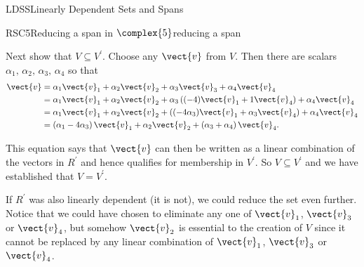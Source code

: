 \begin{subsect}{LDSS}{Linearly Dependent Sets and Spans}
\begin{example}{RSC5}{Reducing a span in $\complex{5}$}{reducing a span}
%
\begin{para}Next show that $V\subseteq V^\prime$.  Choose any $\vect{v}$ from $V$.  Then there are scalars $\alpha_1,\,\alpha_2,\,\alpha_3,\,\alpha_4$ so that
%
\begin{align*}
\vect{v}&=
%
\alpha_1\vect{v}_1+\alpha_2\vect{v}_2+\alpha_3\vect{v}_3+\alpha_4\vect{v}_4\\
%
&=\alpha_1\vect{v}_1+\alpha_2\vect{v}_2+
\alpha_3\left((-4)\vect{v}_1+1\vect{v}_4\right)+
\alpha_4\vect{v}_4\\
%
&=\alpha_1\vect{v}_1+\alpha_2\vect{v}_2+
\left((-4\alpha_3)\vect{v}_1+\alpha_3\vect{v}_4\right)+
\alpha_4\vect{v}_4\\
%
&=\left(\alpha_1-4\alpha_3\right)\vect{v}_1+
\alpha_2\vect{v}_2+
\left(\alpha_3+\alpha_4\right)\vect{v}_4.
\end{align*}
\end{para}
%
\begin{para}This equation says that $\vect{v}$ can then be written as a linear combination of the vectors in $R^\prime$ and hence qualifies for membership in $V^\prime$.  So $V\subseteq V^\prime$ and we have established that $V=V^\prime$.\end{para}
%
\begin{para}If $R^\prime$ was also linearly dependent (it is not), we could reduce the set even further.  Notice that we could have chosen to eliminate any one of $\vect{v}_1$, $\vect{v}_3$ or $\vect{v}_4$, but somehow $\vect{v}_2$ is essential to the creation of $V$ since it cannot be replaced by any linear combination of $\vect{v}_1$, $\vect{v}_3$ or $\vect{v}_4$.\end{para}
%
\end{example}
%
%
\end{subsect}
%
